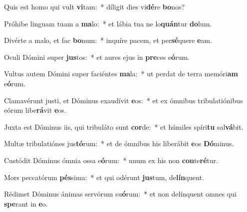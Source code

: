 \item Quis est homo qui vult \textbf{vi}tam:~* díligit dies vi\textbf{dé}re \textbf{bo}nos?
\item Próhibe linguam tuam a \textbf{ma}lo:~* et lábia tua ne lo\textbf{quán}tur \textbf{do}lum.
\item Divérte a malo, et fac \textbf{bo}num:~* inquíre pacem, et per\textbf{sé}quere \textbf{e}am.
\item Oculi Dómini super \textbf{jus}tos:~* et aures ejus in \textbf{pre}ces e\textbf{ó}rum.
\item Vultus autem Dómini super faciéntes \textbf{ma}la:~* ut perdat de terra memóri\textbf{am} e\textbf{ó}rum.
\item Clamavérunt justi, et Dóminus exaudívit \textbf{e}os:~* et ex ómnibus tribulatiónibus eórum libe\textbf{rá}vit \textbf{e}os.
\item Juxta est Dóminus iis, qui tribuláto sunt \textbf{cor}de:~* et húmiles spíri\textbf{tu} sal\textbf{vá}bit.
\item Multæ tribulatiónes jus\textbf{tó}rum:~* et de ómnibus his liberábit \textbf{e}os \textbf{Dó}minus.
\item Custódit Dóminus ómnia ossa e\textbf{ó}rum:~* unum ex his non \textbf{con}te\textbf{ré}tur.
\item Mors peccatórum \textbf{pés}sima:~* et qui odérunt \textbf{jus}tum, de\textbf{lín}quent.
\item Rédimet Dóminus ánimas servórum su\textbf{ó}rum:~* et non delínquent omnes qui \textbf{spe}rant in \textbf{e}o.
